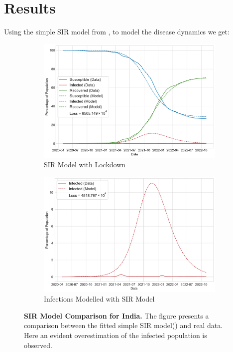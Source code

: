 \documentclass[tikz,fleqn,12pt]{wlscirep}
\begin{document}
\section{Results}
Using the simple SIR model from ,  to model the disease dynamics we get:
\begin{figure}[htbp!]
  \centering
  \begin{subfigure}[t]{\textwidth}
    \centering
    \includegraphics[scale=0.5]{images/SIR_model_IND.pdf}
    \caption{SIR Model with Lockdown}
    \label{fig:SIR_model_IND}
  \end{subfigure}
  \begin{subfigure}[t]{\textwidth}
    \centering
    \includegraphics[scale=0.50]{images/SIR_model_infections_IND.pdf}
    \caption{Infections Modelled with SIR Model}
    \label{fig:SIR_model_infections_IND}
  \end{subfigure}
  \caption{\textbf{SIR Model Comparison for India.} The figure presents a comparison between the fitted simple SIR model() and real data. Here an evident overestimation of the infected population is observed.}
\end{figure}
\end{document}
